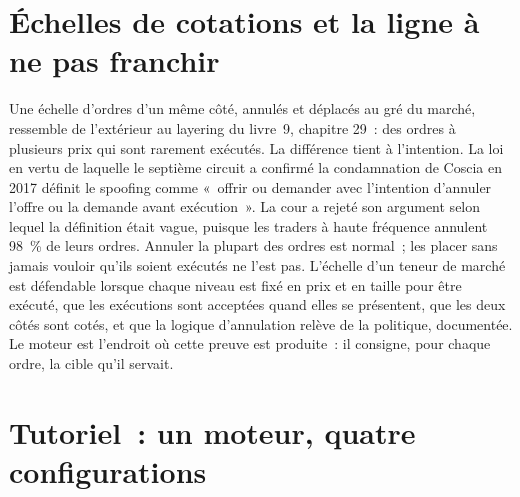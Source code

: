 \section{Échelles de cotations et la ligne à ne pas franchir}

Une échelle d'ordres d'un même côté, annulés et déplacés au gré du marché, ressemble de l'extérieur au layering du livre~9, chapitre
29~: des ordres à plusieurs prix qui sont rarement exécutés. La différence tient à l'intention. La loi en vertu de laquelle le septième circuit a confirmé la condamnation de Coscia en
2017 définit le spoofing comme «~offrir ou demander avec l'intention d'annuler l'offre ou la demande avant exécution~». La cour a rejeté son argument selon lequel
la définition était vague, puisque les traders à haute fréquence annulent 98~\% de leurs ordres. Annuler la plupart des ordres est normal~; les placer sans jamais vouloir
qu'ils soient exécutés ne l'est pas. L'échelle d'un teneur de marché est défendable lorsque chaque niveau est fixé en prix et en taille pour être exécuté, que les exécutions sont acceptées quand elles se présentent, que les deux côtés
sont cotés, et que la logique d'annulation relève de la politique, documentée. Le moteur est l'endroit où cette preuve est produite~: il consigne, pour chaque ordre, la
cible qu'il servait.

\section{Tutoriel~: un moteur, quatre configurations}\label{tut:hf:the-quoting-engine:tut}


